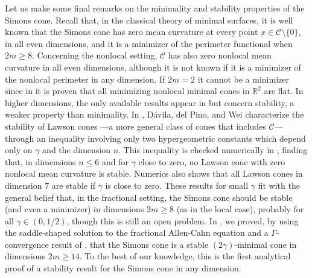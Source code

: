 \documentclass[12pt,reqno]{amsart}
\theoremstyle{definition}
\theoremstyle{remark}
\newcommand{\con}[1]{\mathbb{#1}}
\newcommand{\R}{\con{R}} %
\newcommand{\ccal}{\mathscr{C}}
\newcommand{\s}{\gamma}
\numberwithin{equation}{section}
\begin{document}
Let us make some final remarks on the minimality and stability properties of the Simons cone. Recall that, in the classical theory of minimal surfaces, it is well known that the Simons cone has zero mean curvature at every point $x\in \ccal \setminus \{0\}$, in all even dimensions, and it is a minimizer of the perimeter functional when $2m\geq 8$. Concerning the nonlocal setting, $\ccal$ has also zero nonlocal mean curvature in all even dimensions, although it is not known if it is a minimizer of the nonlocal perimeter in any dimension. If $2m=2$ it cannot be a minimizer since in \cite{SavinValdinoci-Cones} it is proven that all minimizing nonlocal minimal cones in $\R^2$ are flat. In higher dimensions, the only available results appear in \cite{DaviladelPinoWei, Felipe-Sanz-Perela:SaddleFractional} but concern stability, a weaker property than minimality. In \cite{DaviladelPinoWei},  Dávila, del Pino, and Wei characterize the stability of Lawson cones ---a more general class of cones that includes $\ccal$--- through an inequality involving only two hypergeometric constants which depend only on $\s$ and the dimension $n$. This inequality is checked numerically in \cite{DaviladelPinoWei}, finding that, in dimensions $n \leq 6$ and for $\s$ close to zero, no Lawson cone with zero nonlocal mean curvature is stable. Numerics also shows that all Lawson cones in dimension $7$ are stable if $\s$ is close to zero. These results for small $\s$ fit with the general belief that, in the fractional setting, the Simons cone should be stable (and even a minimizer) in dimensions $2m \geq 8$ (as in the local case), probably for all $\s\in(0,1/2)$, though this is still an open problem. In \cite{Felipe-Sanz-Perela:SaddleFractional}, we proved, by using the saddle-shaped solution to the fractional Allen-Cahn equation and a $\Gamma$-convergence result of \cite{CabreCintiSerra-Stable}, that the Simons cone is a stable $(2\s)$-minimal cone in dimensions $2m\geq 14$. To the best of our knowledge, this is the first analytical proof of a stability result for the Simons cone in any dimension.
\end{document}
